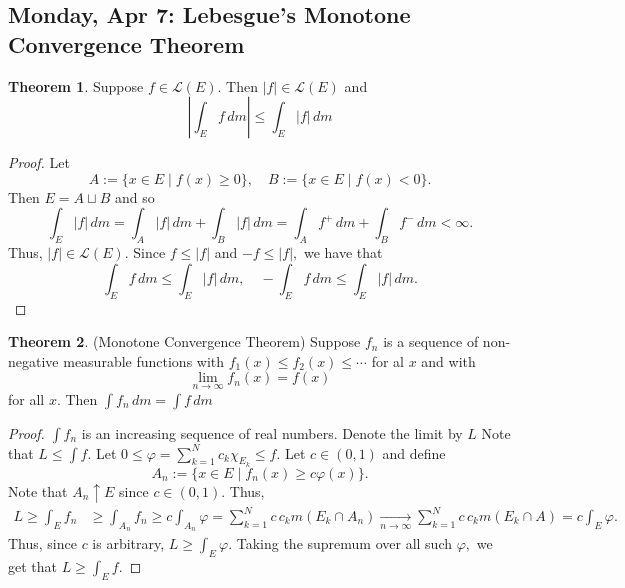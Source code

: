 \documentclass[10pt, oneside]{article}
\theoremstyle{definition}
\newtheorem{thm}{Theorem}
\begin{document}
\newpage
\subsection{Monday, Apr 7: Lebesgue's Monotone Convergence Theorem}
\begin{thm}
    Suppose $f \in \mathcal{L}(E).$ Then $|f| \in \mathcal{L}(E)$ and 
    \[\left|\int_E f\, dm\right| \leq \int_E |f|\, dm\]
\end{thm}

\begin{proof}
   Let \[A:= \{x \in E \mid f(x) \geq 0\}, \quad B:= \{x \in E \mid f(x) < 0\}.\] Then $E = A\sqcup B$ and so 
   \[\int_E |f|\, dm = \int_A |f|\, dm + \int_B |f|\, dm = \int_A f^+ \, dm + \int_B f^- \, dm < \infty.\] Thus, $|f| \in \mathcal{L}(E).$ Since $f\leq |f|$ and $-f \leq |f|,$ we have that 
   \[\int_E f \, dm \leq \int_E |f|\, dm, \quad -\int_E f \, dm \leq \int_E |f|\, dm.\]
\end{proof}

\begin{thm}
    (Monotone Convergence Theorem) Suppose $f_n$ is a sequence of non-negative measurable functions with $f_1(x) \leq f_2(x) \leq \cdots $ for al $x$ and with 
    \[\lim_{n\to \infty}f_n(x) = f(x)\] for all $x.$ Then $\int f_n \, dm = \int f\, dm$
\end{thm}
\begin{proof}
    $\int f_n$ is an increasing sequence of real numbers. Denote the limit by $L$ Note that $L \leq \int f.$ Let $ 0 \leq \varphi = \sum_{k=1}^N c_k \chi_{E_k} \leq f.$ Let $c \in (0,1)$ and define 
    \[A_n:= \{x \in E\mid f_n(x) \geq c\varphi(x)\}.\] Note that $A_n \uparrow E$ since $c\in (0,1).$ Thus, 
    \begin{align*}
        L \geq \int_E f_n &\geq \int_{A_n} f_n \geq c\int_{A_n} \varphi = \sum_{k=1}^N c\,c_k m(E_k \cap A_n) \xrightarrow[n\to \infty]{}\sum_{k=1}^N c\, c_k m(E_k \cap A) = c\int_E \varphi.
    \end{align*}
    Thus, since $c$ is arbitrary, $L \geq \int_E \varphi.$ Taking the supremum over all such $\varphi,$ we get that $L \geq \int_E f.$
\end{proof}


\newpage
\end{document}
